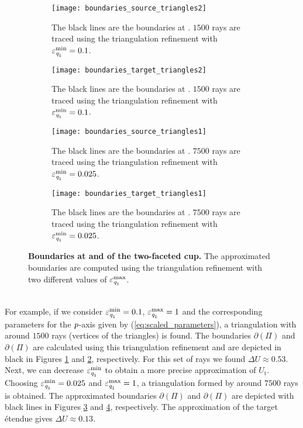 \begin{figure}[t]
\centering
\begin{subfigure}{.45\textwidth}
  \texttt{[image: boundaries\_source\_triangles2]}
 \caption{The black lines are the boundaries at . $1500$ rays are traced using the triangulation refinement with $\varepsilon_{\textit{q}_1}^{\textrm{min}}=0.1$. }
  \label{fig:boundaries_s2}
\end{subfigure}%
\hfill
\begin{subfigure}{.45\textwidth}
  \texttt{[image: boundaries\_target\_triangles2]}
  \caption{The black lines are the boundaries at . $1500$ rays are traced using the triangulation refinement with $\varepsilon_{\textit{q}_1}^{\textrm{min}}=0.1$.} %
  \label{fig:boundaries_t2}
\end{subfigure} %
\hfill
\begin{subfigure}{.45\textwidth}
  \texttt{[image: boundaries\_source\_triangles1]}
  \caption{The black lines are the boundaries at . $7500$ rays are traced using the triangulation refinement with $\varepsilon_{\textit{q}_1}^{\textrm{min}}=0.025$.}
  \label{fig:boundaries_s1}
\end{subfigure}%
\hfill
\begin{subfigure}{.45\textwidth}
  \texttt{[image: boundaries\_target\_triangles1]}
 \caption{The black lines are the boundaries at . $7500$ rays are traced using the triangulation refinement with $\varepsilon_{\textit{q}_1}^{\textrm{min}}=0.025$.} %
  \label{fig:boundaries_t1}
\end{subfigure}
\caption{\textbf{Boundaries at  and  of the two-faceted cup.} The approximated boundaries are computed using the triangulation refinement with two different values of $\varepsilon_{\textit{q}_1}^{\textrm{max}}$.}
\label{fig:boundaries_cup}
\end{figure} 
\\ \indent For example, if we consider $\varepsilon_{\textit{q}_1}^{\textrm{min}}=0.1$, $\varepsilon_{\textit{q}_1}^{\textrm{max}}=1$ and the corresponding parameters for the $\textit{p}$-axis given by (\ref{eq:scaled_parameters}), a triangulation with around $1500$ rays (vertices of the triangles) is found. The boundaries $\partial$$(\Pi)$ and $\partial$$(\Pi)$ are calculated using this triangulation refinement and are depicted in black in Figures \ref{fig:boundaries_s2} and \ref{fig:boundaries_t2}, respectively. For this set of rays we found $\Delta U \approx 0.53 $. Next, we can decrease $\varepsilon_{\textit{q}_1}^{\textrm{min}}$ to obtain a more precise approximation of $U_{\textrm{t}}$. Choosing $\varepsilon_{\textit{q}_1}^{\textrm{min}} = 0.025$ and $\varepsilon_{\textit{q}_1}^{\textrm{max}}=1$, a triangulation formed by around $7500$ rays is obtained. The approximated boundaries $\partial$$(\Pi)$ and $\partial$$(\Pi)$ are depicted with black lines in Figures \ref{fig:boundaries_s1} and \ref{fig:boundaries_t1}, respectively. The approximation of the target \'{e}tendue gives $\Delta U \approx 0.13 $.
